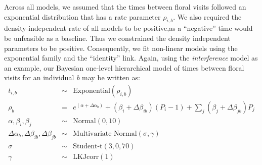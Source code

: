 \begin{refsection}
Across all models, we assumed that the times between floral visits followed an exponential distribution that has a rate parameter $\rho_{i,b}$. We also required  the density-independent rate of all models to be positive,as a ``negative'' time would be unfeasible as a baseline. Thus we constrained the density independent parameters to be positive. Consequently, we fit non-linear models using the exponential family and the ``identity'' link. Again, using the \textit{interference} model as an example, our Bayesian one-level hierarchical model of times between floral visits for an individual \textit{b} may be written as:
  \begin{eqnarray}
   t_{i,b} &\sim& {\textrm{Exponential}}(\rho_{i,b}) \\
  \rho_{b} &=& e^{(\alpha + \Delta \alpha_{b})} +  (\beta_{i}+ \Delta\beta_{ib})  (P_{i}-1) +    \sum_{j} (\beta_{j}+ \Delta\beta_{jb})P_{j} \\
{\alpha,\beta_{i},\beta_{j}} &\sim& {\textrm{Normal}}(0,10) \\
{\Delta\alpha_{b}, \Delta\beta_{ib},\Delta\beta_{jb}}  &\sim&{\textrm{Multivariate Normal}} (\sigma,\gamma) \\
\sigma &\sim& {\text{Student-t}} (3,0,70)\\
\gamma &\sim& {\textrm{LKJcorr}}(1)
  \end{eqnarray}


\end{refsection}
